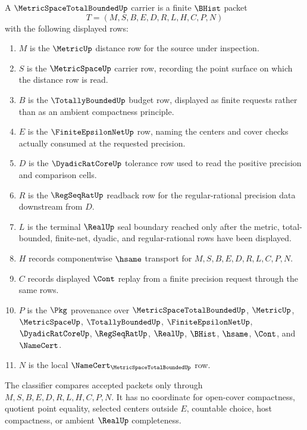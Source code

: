 \begin{definition}
\label{def:metric-space-total-bounded-namecert-carrier}
A $\MetricSpaceTotalBoundedUp$ carrier is a finite $\BHist$ packet
$$
T=(M,S,B,E,D,R,L,H,C,P,N)
$$
with the following displayed rows:
\begin{enumerate}
\item $M$ is the $\MetricUp$ distance row for the source under inspection.
\item $S$ is the $\MetricSpaceUp$ carrier row, recording the point surface on which the distance row is read.
\item $B$ is the $\TotallyBoundedUp$ budget row, displayed as finite requests rather than as an ambient compactness principle.
\item $E$ is the $\FiniteEpsilonNetUp$ row, naming the centers and cover checks actually consumed at the requested precision.
\item $D$ is the $\DyadicRatCoreUp$ tolerance row used to read the positive precision and comparison cells.
\item $R$ is the $\RegSeqRatUp$ readback row for the regular-rational precision data downstream from $D$.
\item $L$ is the terminal $\RealUp$ seal boundary reached only after the metric, total-bounded, finite-net, dyadic, and regular-rational rows have been displayed.
\item $H$ records componentwise $\hsame$ transport for $M,S,B,E,D,R,L,C,P,N$.
\item $C$ records displayed $\Cont$ replay from a finite precision request through the same rows.
\item $P$ is the $\Pkg$ provenance over $\MetricSpaceTotalBoundedUp$, $\MetricUp$, $\MetricSpaceUp$, $\TotallyBoundedUp$, $\FiniteEpsilonNetUp$, $\DyadicRatCoreUp$, $\RegSeqRatUp$, $\RealUp$, $\BHist$, $\hsame$, $\Cont$, and $\NameCert$.
\item $N$ is the local $\NameCert_{\MetricSpaceTotalBoundedUp}$ row.
\end{enumerate}
The classifier compares accepted packets only through $M,S,B,E,D,R,L,H,C,P,N$. It has no coordinate for open-cover compactness, quotient point equality, selected centers outside $E$, countable choice, host compactness, or ambient $\RealUp$ completeness.
\end{definition}

